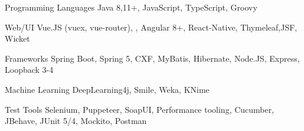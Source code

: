 


\begin{cvskills}


  \cvskill
  {Programming Languages} %
  {Java 8,11+, JavaScript, TypeScript, Groovy} %

    
  \cvskill
  {Web/UI} %
  {Vue.JS (vuex, vue-router), , Angular 8+, React-Native, Thymeleaf,JSF, Wicket} %

  \cvskill
  {Frameworks} %
  {Spring Boot, Spring 5, CXF, MyBatis, Hibernate, Node.JS, Express, Loopback 3-4} %

  \cvskill
  {Machine Learning} %
  {DeepLearning4j, Smile, Weka, KNime} %


  \cvskill
  {Test Tools} %
  {Selenium, Puppeteer, SoapUI, Performance tooling, Cucumber, JBehave, JUnit 5/4, Mockito, Postman} %

\end{cvskills}




